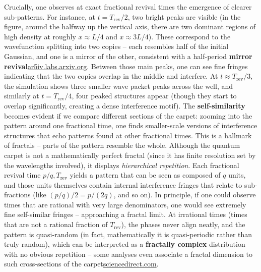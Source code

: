 \documentclass[11pt,a4paper]{article}
\begin{document}
Crucially, one observes at exact fractional revival times the emergence of clearer sub-patterns. For instance, at \textbf{$t = T_{\text{rev}}/2$}, two bright peaks are visible (in the figure, around the halfway up the vertical axis, there are two dominant regions of high density at roughly $x \approx L/4$ and $x \approx 3L/4$). These correspond to the wavefunction splitting into two copies – each resembles half of the initial Gaussian, and one is a mirror of the other, consistent with a half-period \textbf{mirror revival}\href{https://ar5iv.labs.arxiv.org/html/1808.09708#:~:text=Besides full revival%2C there is,( 48}{ar5iv.labs.arxiv.org}. Between those main peaks, one can see fine fringes indicating that the two copies overlap in the middle and interfere. At \textbf{$t \approx T_{\text{rev}}/3$}, the simulation shows three smaller wave packet peaks across the well, and similarly at $t=T_{\text{rev}}/4$, four peaked structures appear (though they start to overlap significantly, creating a dense interference motif). The \textbf{self-similarity} becomes evident if we compare different sections of the carpet: zooming into the pattern around one fractional time, one finds smaller-scale versions of interference structures that echo patterns found at other fractional times. This is a hallmark of fractals – parts of the pattern resemble the whole. Although the quantum carpet is not a mathematically perfect fractal (since it has finite resolution set by the wavelengths involved), it displays \emph{hierarchical repetition}. Each fractional revival time $p/q,T_{\text{rev}}$ yields a pattern that can be seen as composed of $q$ units, and those units themselves contain internal interference fringes that relate to sub-fractions (like $(p/q)/2 = p/(2q)$, and so on). In principle, if one could observe times that are rational with very large denominators, one would see extremely fine self-similar fringes – approaching a fractal limit. At irrational times (times that are not a rational fraction of $T_{\text{rev}}$), the phases never align neatly, and the pattern is quasi-random (in fact, mathematically it is quasi-periodic rather than truly random), which can be interpreted as a \textbf{fractally complex} distribution with no obvious repetition – some analyses even associate a fractal dimension to such cross-sections of the carpet\href{https://www.sciencedirect.com/science/article/abs/pii/S0034487724000223#:~:text=QUANTUM REVIVALS AND FRACTALITY FOR,initial data at rational times}{sciencedirect.com}.
\end{document}

